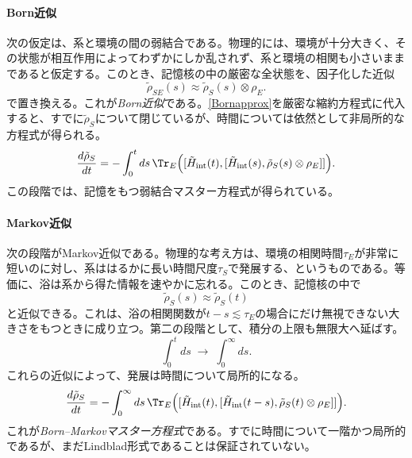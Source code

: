 \documentclass[a4paper,11pt,oneside]{article}
\theoremstyle{definition}
\numberwithin{equation}{section}
\begin{document}
\paragraph{Born近似}



次の仮定は、系と環境の間の弱結合である。物理的には、環境が十分大きく、その状態が相互作用によってわずかにしか乱されず、系と環境の相関も小さいままであると仮定する。このとき、記憶核の中の厳密な全状態を、因子化した近似
\begin{equation}\label{Bornapprox}
\tilde \rho_{SE}(s) \approx \tilde \rho_S(s)\otimes \rho_E .
\end{equation}
で置き換える。これが\textit{Born近似}である。\eqref{Bornapprox}を厳密な縮約方程式に代入すると、すでに$\tilde \rho_S$について閉じているが、時間については依然として非局所的な方程式が得られる。
\begin{equation}\label{BornME}
\frac{d\tilde \rho_S}{dt}
=
-\int_0^t ds\,
\Tr_E\Bigl(
[\tilde H_{\rm int}(t),[\tilde H_{\rm int}(s),\tilde \rho_S(s)\otimes \rho_E]]
\Bigr) .
\end{equation}
この段階では、記憶をもつ弱結合マスター方程式が得られている。



\paragraph{Markov近似}



次の段階がMarkov近似である。物理的な考え方は、環境の相関時間$\tau_E$が非常に短いのに対し、系ははるかに長い時間尺度$\tau_S$で発展する、というものである。等価に、浴は系から得た情報を速やかに忘れる。このとき、記憶核の中で
\begin{equation}
\tilde \rho_S(s) \approx \tilde \rho_S(t)
\end{equation}
と近似できる。これは、浴の相関関数が$t-s\lesssim \tau_E$の場合にだけ無視できない大きさをもつときに成り立つ。第二の段階として、積分の上限も無限大へ延ばす。
\begin{equation}
\int_0^t ds \;\longrightarrow\; \int_0^\infty ds .
\end{equation}
これらの近似によって、発展は時間について局所的になる。
\begin{equation}\label{BornMarkovME}
\frac{d\tilde \rho_S}{dt}
=
-\int_0^\infty ds\,
\Tr_E\Bigl(
[\tilde H_{\rm int}(t),[\tilde H_{\rm int}(t-s),\tilde \rho_S(t)\otimes \rho_E]]
\Bigr) .
\end{equation}
これが\textit{Born--Markovマスター方程式}である。すでに時間について一階かつ局所的であるが、まだLindblad形式であることは保証されていない。
\end{document}
